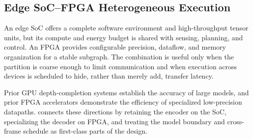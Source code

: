 \subsection{Edge SoC--FPGA Heterogeneous Execution}

An edge SoC offers a complete software environment and high-throughput tensor
units, but its compute and energy budget is shared with sensing, planning, and
control.  An FPGA provides configurable precision, dataflow, and memory
organization for a stable subgraph.  The combination is useful only when the
partition is coarse enough to limit communication and when execution across
devices is scheduled to hide, rather than merely add, transfer latency.

Prior GPU depth-completion systems establish the accuracy of large models, and
prior FPGA accelerators demonstrate the efficiency of specialized low-precision
datapaths.  \system{} connects these directions by retaining the encoder on the
SoC, specializing the decoder on FPGA, and treating the model boundary and
cross-frame schedule as first-class parts of the design.
